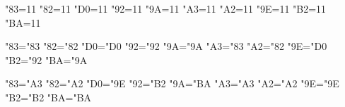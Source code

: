 %
%
% 
%
%
\begingroup
{} 
\catcode"83=11  %
\catcode"82=11  %
\catcode"D0=11  %
\catcode"92=11  %
\catcode"9A=11  %
\catcode"A3=11  %
\catcode"A2=11  %
\catcode"9E=11  %
\catcode"B2=11  %
\catcode"BA=11  %

\uccode"83="83
\uccode"82="82
\uccode"D0="D0
\uccode"92="92
\uccode"9A="9A
\uccode"A3="83
\uccode"A2="82
\uccode"9E="D0
\uccode"B2="92
\uccode"BA="9A

\lccode"83="A3
\lccode"82="A2
\lccode"D0="9E
\lccode"92="B2
\lccode"9A="BA
\lccode"A3="A3
\lccode"A2="A2
\lccode"9E="9E
\lccode"B2="B2
\lccode"BA="BA

